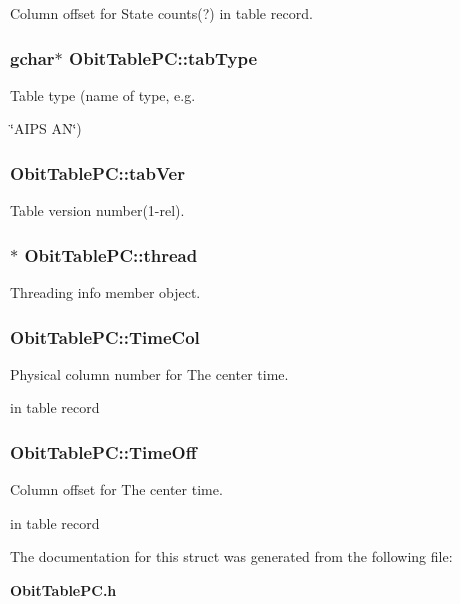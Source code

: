 Column offset for State counts(?) in table record. 

\subsubsection{\setlength{\rightskip}{0pt plus 5cm}gchar$\ast$ {\bf Obit\-Table\-PC::tab\-Type}}\label{structObitTablePC_o12}


Table type (name of type, e.g. 

\char`\"{}AIPS AN\char`\"{}) 
\subsubsection{ {\bf Obit\-Table\-PC::tab\-Ver}}\label{structObitTablePC_o13}


Table version number(1-rel). 

\subsubsection{$\ast$ {\bf Obit\-Table\-PC::thread}}\label{structObitTablePC_o4}


Threading info member object. 

\subsubsection{ {\bf Obit\-Table\-PC::Time\-Col}}\label{structObitTablePC_o20}


Physical column number for The center time. 

in table record 
\subsubsection{ {\bf Obit\-Table\-PC::Time\-Off}}\label{structObitTablePC_o19}


Column offset for The center time. 

in table record 

The documentation for this struct was generated from the following file:\begin{CompactItemize}
\item 
{\bf Obit\-Table\-PC.h}\end{CompactItemize}

